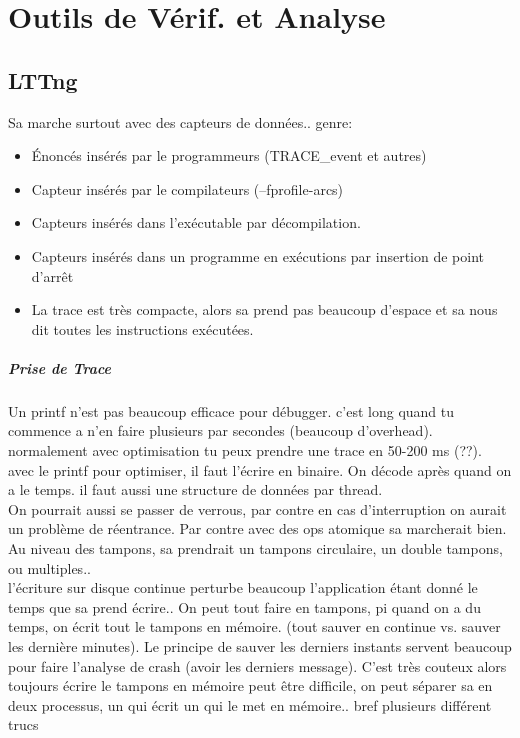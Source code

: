 \documentclass[oneside]{book}
\begin{document}


\chapter{Outils de Vérif. et Analyse}
\section{LTTng}
Sa marche surtout avec des capteurs de données.. genre:

\begin{itemize}
\item Énoncés insérés par le programmeurs (TRACE\_event et autres)
\item Capteur insérés par le compilateurs (--fprofile-arcs)
\item Capteurs insérés dans l'exécutable par décompilation.
\item Capteurs insérés dans un programme en exécutions par insertion de point d'arrêt
\item La trace est très compacte, alors sa prend pas beaucoup d'espace et sa nous dit toutes les instructions exécutées.
\end{itemize}
\paragraph{Prise de Trace}
Un printf n'est pas beaucoup efficace pour débugger. c'est long quand tu commence a n'en faire plusieurs par secondes (beaucoup d'overhead). normalement avec optimisation tu peux prendre une trace en 50-200 ms (??). avec le printf pour optimiser, il faut l'écrire en binaire. On décode après quand on a le temps. il faut aussi une structure de données par thread. \\

On pourrait aussi se passer de verrous, par contre en cas d'interruption on aurait un problème de réentrance. Par contre avec des ops atomique sa marcherait bien.\\

Au niveau des tampons, sa prendrait un tampons circulaire, un double tampons, ou multiples..\\

l'écriture sur disque continue perturbe beaucoup l'application étant donné le temps que sa prend écrire.. On peut tout faire en tampons, pi quand on a du temps, on écrit tout le tampons en mémoire. (tout sauver en continue vs. sauver les dernière minutes). Le principe de sauver les derniers instants servent beaucoup pour faire l'analyse de crash (avoir les derniers message). C'est très couteux alors toujours écrire le tampons en mémoire peut être difficile, on peut séparer sa en deux processus, un qui écrit un qui le met en mémoire.. bref plusieurs différent trucs
\end{document}
